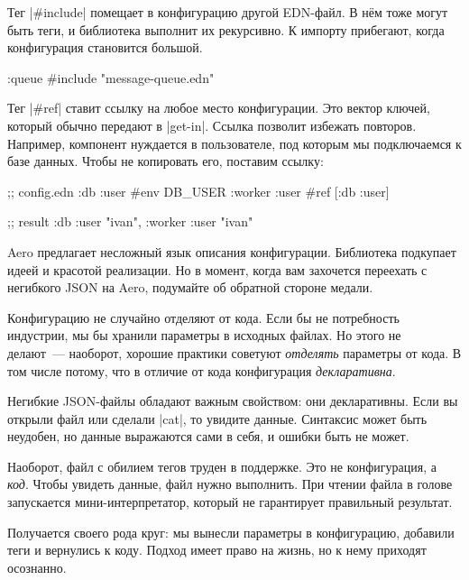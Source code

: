 Тег \spverb|#include| помещает в конфигурацию другой EDN-файл. В н\"{е}м тоже могут
быть теги, и библиотека выполнит их рекурсивно. К импорту прибегают, когда
конфигурация становится большой.

\begin{english}
  \begin{clojure}
{:queue #include "message-queue.edn"}
  \end{clojure}
\end{english}

Тег \spverb|#ref| ставит ссылку на любое место конфигурации. Это вектор ключей,
который обычно передают в \spverb|get-in|. Ссылка позволит избежать повторов.
Например, компонент нуждается в пользователе, под которым мы подключаемся к базе
данных. Чтобы не копировать его, поставим ссылку:

\begin{english}
  \begin{clojure}
;; config.edn
{:db {:user #env DB_USER}
 :worker {:user #ref [:db :user]}}

;; result
{:db {:user "ivan"}, :worker {:user "ivan"}}
  \end{clojure}
\end{english}

Aero предлагает несложный язык описания конфигурации. Библиотека подкупает идеей
и красотой реализации. Но в момент, когда вам захочется переехать с негибкого
JSON на Aero, подумайте об обратной стороне медали.


Конфигурацию не случайно отделяют от кода. Если бы не потребность индустрии, мы
бы хранили параметры в исходных файлах. Но этого не делают~--- наоборот, хорошие
практики советуют \emph{отделять} параметры от кода. В том числе потому, что в
отличие от кода конфигурация \emph{декларативна}.

Негибкие JSON-файлы обладают важным свойством: они декларативны. Если вы открыли
файл или сделали \spverb|cat|, то увидите данные. Синтаксис может быть неудобен,
но данные выражаются сами в себя, и ошибки быть не может.

Наоборот, файл с обилием тегов труден в поддержке. Это не конфигурация,
а \emph{код}. Чтобы увидеть данные, файл нужно выполнить. При чтении
файла в голове запускается мини-интерпретатор, который не гарантирует
правильный результат.

Получается своего рода круг: мы вынесли параметры в конфигурацию, добавили теги
и вернулись к коду. Подход имеет право на жизнь, но к нему приходят осознанно.


